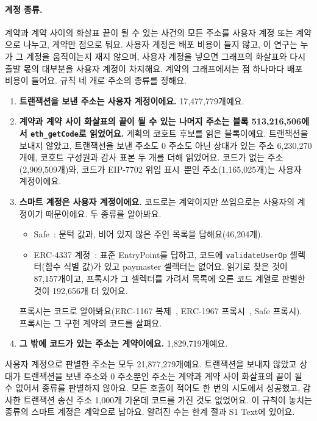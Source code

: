 \paragraph{계정 종류.}
계약과 계약 사이의 화살표 끝이 될 수 있는 사건의 모든 주소를 사용자 계정 또는 계약으로 나누고, 계약만 점으로 둬요. 사용자 계정은 배포 비용이 들지 않고, 이 연구는 누가 그 계정을 움직이는지 재지 않으며, 사용자 계정을 넣으면 그래프의 화살표와 다시 출발 몫의 대부분을 사용자 계정이 차지해요. 계약의 그래프에서는 점 하나마다 배포 비용이 들어요. 규칙 네 개로 주소의 종류를 정해요.
\begin{enumerate}
\item \textbf{트랜잭션을 보낸 주소는 사용자 계정이에요.} 17,477,779개예요.
\item \textbf{계약과 계약 사이 화살표의 끝이 될 수 있는 나머지 주소는 블록 513,216,506에서 \texttt{eth\_getCode}로 읽었어요.} 계획의 코호트 후보를 읽은 블록이에요. 트랜잭션을 보내지 않았고, 트랜잭션을 보낸 주소도 0 주소도 아닌 상대가 있는 주소 6,230,270개에, 코호트 구성원과 감사 표본 두 개를 더해 읽었어요. 코드가 없는 주소(2,909,509개)와, 코드가 EIP-7702 위임 표시~\cite{buterin2024eip7702}뿐인 주소(1,165,025개)는 사용자 계정이에요.
\item \textbf{스마트 계정은 사용자 계정이에요.} 코드로는 계약이지만 쓰임으로는 사용자의 계정이기 때문이에요. 두 종류를 알아봐요.
\begin{itemize}
\item Safe~\cite{safenddocs}: 문턱 값과, 비어 있지 않은 주인 목록을 답해요(46,204개).
\item ERC-4337 계정~\cite{buterin2021erc4337}: 표준 EntryPoint를 답하고, 코드에 \texttt{validateUserOp} 셀렉터(함수 식별 값)가 있고 paymaster 셀렉터는 없어요. 읽기로 찾은 것이 87,157개이고, 프록시가 그 셀렉터를 가려서 목록에 오른 코드 계열로 판별한 것이 192,656개 더 있어요.
\end{itemize}
프록시는 코드로 알아봐요(ERC-1167 복제~\cite{murray2018erc1167}, ERC-1967 프록시~\cite{palladino2019erc1967}, Safe 프록시). 프록시는 그 구현 계약의 코드를 살펴요.
\item \textbf{그 밖에 코드가 있는 주소는 계약이에요.} 1,829,719개예요.
\end{enumerate}
사용자 계정으로 판별한 주소는 모두 21,877,279개예요. 트랜잭션을 보내지 않았고 상대가 트랜잭션을 보낸 주소와 0 주소뿐인 주소는 계약과 계약 사이 화살표의 끝이 될 수 없어서 종류를 판별하지 않아요. 모든 호출이 적어도 한 번의 시도에서 성공했고, 감사한 트랜잭션 송신 주소 1,000개 가운데 코드를 가진 것도 없었어요. 이 규칙이 놓치는 종류의 스마트 계정은 계약으로 남아요. 알려진 수는 한계 절과 S1 Text에 있어요.

